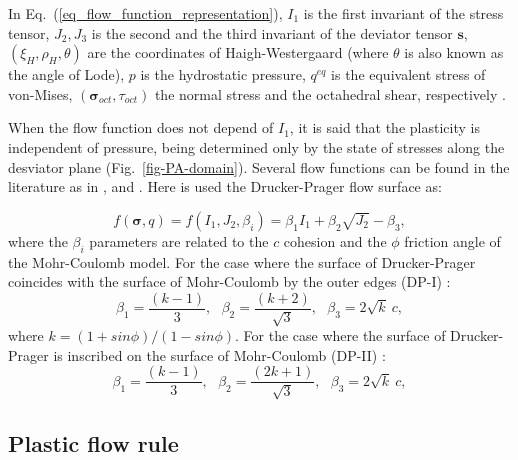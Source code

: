 \documentclass[Journal,letterpaper]{ascelike-new}
\newcommand{\sll}{\boldsymbol{s}}
\newcommand{\stress}{\boldsymbol{\sigma}}
\begin{document}
In Eq.~(\ref{eq_flow_function_representation}), $I_1$ is the first invariant of the stress tensor, $J_2,J_3$ is the second and the third invariant of the deviator tensor $\sll$, $(\xi_{H},\rho_{H},\theta)$ are the coordinates of Haigh-Westergaard
(where $\theta$ is also known as the angle of Lode), $p$ is the hydrostatic pressure, $q^{eq}$ is the equivalent stress of von-Mises,  $(\stress_{oct},\tau_{oct})$ the normal stress and the octahedral shear, respectively \cite{chen1988}.

When the flow function does not depend of $I_1$, it is said that the plasticity is independent of pressure, being determined only by the state of stresses along the desviator plane (Fig.~\ref{fig-PA-domain}). Several flow functions can be found in the literature as in ,  and . Here is used the Drucker-Prager flow surface as:

\begin{equation}
	\label{eq:f_Drucker_Prager}
	f(\stress,q) = f(I_1,J_2,\beta_i) = \beta_1 I_1 +\beta_2 \sqrt{J_2}-\beta_3,
\end{equation}
where the $\beta_i$ parameters are related to the $c$ cohesion and the $\phi$ friction angle of the Mohr-Coulomb model. For the case where the surface of Drucker-Prager coincides with the surface of Mohr-Coulomb by the outer edges (DP-I) \cite{bernaud1991}:
\begin{equation}
	\label{eq:f_DP_circunscrita_MC}
	\beta_1 = \dfrac{(k-1)}{3}, ~~~ \beta_2 = \dfrac{(k+2)}{\sqrt{3}}, ~~~
	\beta_3 = 2\sqrt{k}~c,
\end{equation}
where $k = (1+sin{\phi})/(1-sin{\phi})$. For the case where the surface of Drucker-Prager is inscribed on the surface of Mohr-Coulomb (DP-II) \cite{bernaud1991}:
\begin{equation}
	\label{eq:f_DP_inscrita_MC}
	\beta_1 = \dfrac{(k-1)}{3}, ~~~ \beta_2 = \dfrac{(2k+1)}{\sqrt{3}}, ~~~
	\beta_3 = 2\sqrt{k}~c,
\end{equation}

\subsection{Plastic flow rule}
\end{document}
